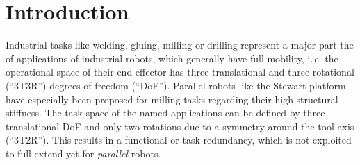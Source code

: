 \documentclass[robotics,article,submit,moreauthors,pdftex]{Definitions/mdpi}
\begin{document}

\section{Introduction}
\label{sec:intro}


Industrial tasks like welding, gluing, milling or drilling represent a major part the of applications of industrial robots, which generally have full mobility, i.\,e. the operational space of their end-effector has three translational and three rotational (``3T3R'') degrees of freedom (``DoF'').
Parallel robots like the Stewart-platform have especially been proposed for milling tasks regarding their high structural stiffness.
The task space of the named applications can be defined by three translational DoF and only two rotations due to a symmetry around the tool axis (``3T2R'').
This results in a functional or task redundancy, which is not exploited to full extend yet for \emph{parallel} robots.
\end{document}
